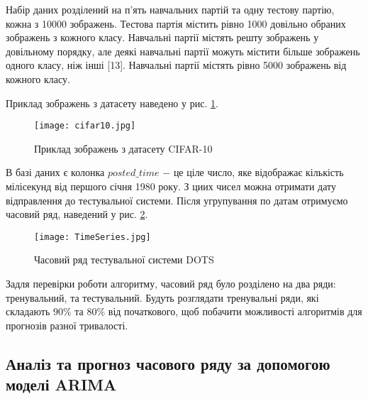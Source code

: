 Набір даних розділений на п’ять навчальних партій та одну тестову партію, кожна з 10000 зображень. Тестова партія містить рівно 1000 довільно обраних зображень з кожного класу. Навчальні партії містять решту зображень у довільному порядку, але деякі навчальні партії можуть містити більше зображень одного класу, ніж інші [13]. Навчальні партії містять рівно 5000 зображень від кожного класу.

Приклад зображень з датасету наведено у рис. \ref{fig:cifar10}.

\vspace{1em}

\begin{figure}[h]
  \texttt{[image: cifar10.jpg]}
  \caption{Приклад зображень з датасету CIFAR-10}
  \label{fig:cifar10}
\end{figure}

\newpage

В базі даних є колонка $posted\_time$ $-$ це ціле число, яке відображає кількість мілісекунд від першого січня 1980 року. З циих чисел можна отримати дату відправлення до тестувальної системи. Після угрупування по датам отримуємо часовий ряд, наведений у рис. \ref{fig:TimeSeries}.



\vspace{1em}

\begin{figure}[h]
  \texttt{[image: TimeSeries.jpg]}
  \caption{Часовий ряд тестувальної системи DOTS}
  \label{fig:TimeSeries}
\end{figure}

Задля перевірки роботи алгоритму, часовий ряд було розділено на два ряди: тренувальний, та тестувальний. Будуть розглядати тренувальні ряди, які складають $90\%$ та $80\%$ від початкового, щоб побачити можливості алгоритмів для прогнозів разної тривалості.

\subsection{Аналіз та прогноз часового ряду за допомогою моделі ARIMA}

